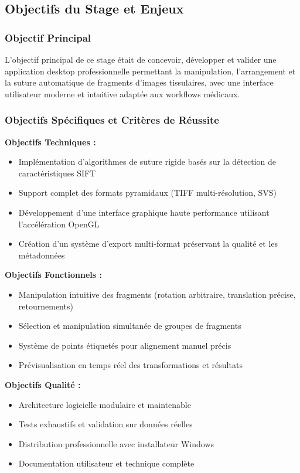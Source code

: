 \documentclass[12pt,a4paper]{article}
\begin{document}
\subsection{Objectifs du Stage et Enjeux}

\subsubsection{Objectif Principal}

L'objectif principal de ce stage était de concevoir, développer et valider une application desktop professionnelle permettant la manipulation, l'arrangement et la suture automatique de fragments d'images tissulaires, avec une interface utilisateur moderne et intuitive adaptée aux workflows médicaux.

\subsubsection{Objectifs Spécifiques et Critères de Réussite}

\textbf{Objectifs Techniques :}
\begin{itemize}
\item Implémentation d'algorithmes de suture rigide basés sur la détection de caractéristiques SIFT
\item Support complet des formats pyramidaux (TIFF multi-résolution, SVS)
\item Développement d'une interface graphique haute performance utilisant l'accélération OpenGL
\item Création d'un système d'export multi-format préservant la qualité et les métadonnées
\end{itemize}

\textbf{Objectifs Fonctionnels :}
\begin{itemize}
\item Manipulation intuitive des fragments (rotation arbitraire, translation précise, retournements)
\item Sélection et manipulation simultanée de groupes de fragments
\item Système de points étiquetés pour alignement manuel précis
\item Prévisualisation en temps réel des transformations et résultats
\end{itemize}

\textbf{Objectifs Qualité :}
\begin{itemize}
\item Architecture logicielle modulaire et maintenable
\item Tests exhaustifs et validation sur données réelles
\item Distribution professionnelle avec installateur Windows
\item Documentation utilisateur et technique complète
\end{itemize}
\end{document}
